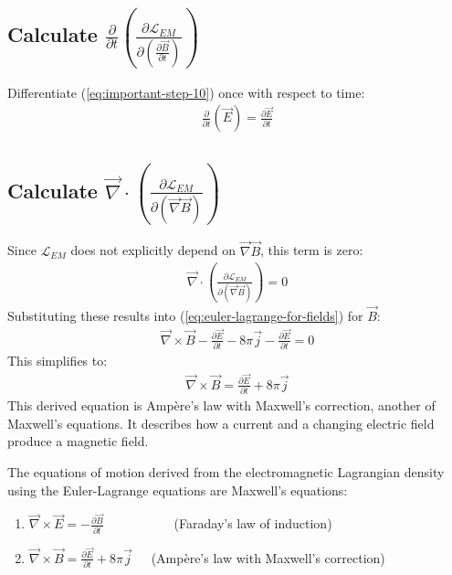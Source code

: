 \begin{enumerate}
\subsection*{Calculate $\displaystyle\frac{\partial}{\partial t} \left(\frac{\displaystyle\partial \mathcal{L}_{EM}}{\displaystyle\partial \left(\frac{\partial \vec{B}}{\partial t}\right)} \right)$}
Differentiate (\ref{eq:important-step-10}) once with respect to time:
\begin{align}
    \frac{\partial}{\partial t} \left( \vec{E} \right) = \frac{\partial \vec{E}}{\partial t}
\end{align}
\subsection*{Calculate $\vec{\nabla} \cdot \left( \frac{\displaystyle\partial \mathcal{L}_{EM}}{\displaystyle\partial (\vec{\nabla} \vec{B})} \right)$}
Since $\mathcal{L}_{EM}$ does not explicitly depend on $\vec{\nabla} \vec{B}$, this term is zero:
\begin{align}
    \vec{\nabla} \cdot \left( \frac{\partial \mathcal{L}_{EM}}{\partial (\vec{\nabla} \vec{B})} \right) = 0
\end{align}
Substituting these results into (\ref{eq:euler-lagrange-for-fields}) for $\vec{B}$:
\begin{align}
    \vec{\nabla} \times \vec{B} - \frac{\partial \vec{E}}{\partial t} - 8\pi \vec{j} - \frac{\partial \vec{E}}{\partial t} = 0
\end{align}
This simplifies to:
\begin{align}
    \vec{\nabla} \times \vec{B} = \frac{\partial \vec{E}}{\partial t} + 8\pi \vec{j}
\end{align}
This derived equation is Ampère's law with Maxwell's correction, another of Maxwell's equations. It describes how a current and a changing electric field produce a magnetic field.

The equations of motion derived from the electromagnetic Lagrangian density using the Euler-Lagrange equations are Maxwell's equations:
\begin{enumerate}[label={(\alph*)}]
    \item $\displaystyle \vec{\nabla} \times \vec{E} = -\frac{\partial \vec{B}}{\partial t}$~~~~~~~~~~~(Faraday's law of induction)
    \item $\displaystyle \vec{\nabla} \times \vec{B} = \frac{\partial \vec{E}}{\partial t} + 8\pi \vec{j}$~~~(Ampère's law with Maxwell's correction)
\end{enumerate}
\bigskip\bigskip\hline\hline\bigskip
\end{enumerate}